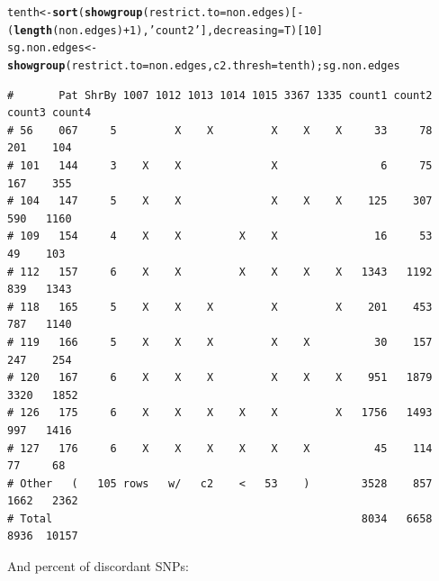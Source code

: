 \documentclass{article}\usepackage[]{graphicx}\usepackage[]{color}
\makeatletter
\newcommand{\hlnum}[1]{\textcolor[rgb]{0.686,0.059,0.569}{#1}}%
\newcommand{\hlstr}[1]{\textcolor[rgb]{0.192,0.494,0.8}{#1}}%
\newcommand{\hlopt}[1]{\textcolor[rgb]{0,0,0}{#1}}%
\newcommand{\hlstd}[1]{\textcolor[rgb]{0.345,0.345,0.345}{#1}}%
\newcommand{\hlkwb}[1]{\textcolor[rgb]{0.69,0.353,0.396}{#1}}%
\newcommand{\hlkwc}[1]{\textcolor[rgb]{0.333,0.667,0.333}{#1}}%
\newcommand{\hlkwd}[1]{\textcolor[rgb]{0.737,0.353,0.396}{\textbf{#1}}}%
\newenvironment{kframe}{%
 \def\at@end@of@kframe{}%
 \ifinner\ifhmode%
  \def\at@end@of@kframe{\end{minipage}}%
  \begin{minipage}{\columnwidth}%
 \fi\fi%
 \def\FrameCommand##1{\hskip\@totalleftmargin \hskip-\fboxsep
 \colorbox{shadecolor}{##1}\hskip-\fboxsep
     \hskip-\linewidth \hskip-\@totalleftmargin \hskip\columnwidth}%
 \MakeFramed {\advance\hsize-\width
   \@totalleftmargin\z@ \linewidth\hsize
   \@setminipage}}%
 {\par\unskip\endMakeFramed%
 \at@end@of@kframe}
\newenvironment{knitrout}{}{} %
\makeatother
\begin{document}
\begin{knitrout}\scriptsize
{}\color{fgcolor}\begin{kframe}
\begin{alltt}
\hlstd{tenth} \hlkwb{<-} \hlkwd{sort}\hlstd{(}\hlkwd{showgroup}\hlstd{(}\hlkwc{restrict.to}\hlstd{=non.edges)[}\hlopt{-}\hlstd{(}\hlkwd{length}\hlstd{(non.edges)}\hlopt{+}\hlnum{1}\hlstd{),}\hlstr{'count2'}\hlstd{],}\hlkwc{decreasing}\hlstd{=T)[}\hlnum{10}\hlstd{]}
\hlstd{sg.non.edges} \hlkwb{<-} \hlkwd{showgroup}\hlstd{(}\hlkwc{restrict.to}\hlstd{=non.edges,} \hlkwc{c2.thresh} \hlstd{= tenth) ; sg.non.edges}
\end{alltt}
\begin{verbatim}
#       Pat ShrBy 1007 1012 1013 1014 1015 3367 1335 count1 count2 count3 count4
# 56    067     5         X    X         X    X    X     33     78    201    104
# 101   144     3    X    X              X                6     75    167    355
# 104   147     5    X    X              X    X    X    125    307    590   1160
# 109   154     4    X    X         X    X               16     53     49    103
# 112   157     6    X    X         X    X    X    X   1343   1192    839   1343
# 118   165     5    X    X    X         X         X    201    453    787   1140
# 119   166     5    X    X    X         X    X          30    157    247    254
# 120   167     6    X    X    X         X    X    X    951   1879   3320   1852
# 126   175     6    X    X    X    X    X         X   1756   1493    997   1416
# 127   176     6    X    X    X    X    X    X          45    114     77     68
# Other   (   105 rows   w/   c2    <   53    )        3528    857   1662   2362
# Total                                                8034   6658   8936  10157
\end{verbatim}
\end{kframe}
\end{knitrout}

And percent of discordant SNPs:
\end{document}
